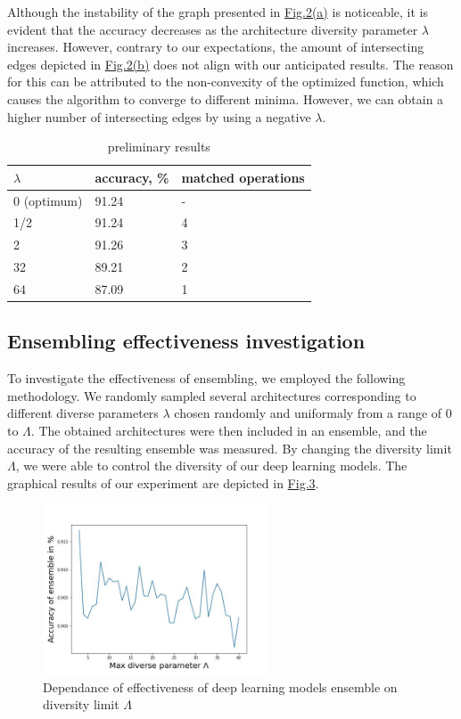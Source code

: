 \documentclass{article}
\begin{document}
Although the instability of the graph presented in \hyperref[fig:graph1]{Fig.2(a)} is noticeable, it is evident that the accuracy decreases as the architecture diversity parameter $\lambda$ increases.
However, contrary to our expectations, the amount of intersecting edges depicted in \hyperref[fig:graph2]{Fig.2(b)} does not align with our anticipated results.
The reason for this can be attributed to the non-convexity of the optimized function, which causes the algorithm to converge to different minima.
However, we can obtain a higher number of intersecting edges by using a negative $\lambda$.

\begin{table}[h   ]
	\caption{preliminary results}
	\centering
	\begin{tabular}{lll}
		\midrule
		$\lambda$     & accuracy, \% & matched operations \\
		\midrule
        0 (optimum) & 91.24 & - \\ 
        1/2  & 91.24 &  4   \\
		2  & 91.26   &  3   \\
		32 & 89.21   &  2   \\
		64 & 87.09   &  1   \\
		\bottomrule
	\end{tabular}
	\label{tab:prelim}
\end{table}

\subsection{Ensembling effectiveness investigation}

To investigate the effectiveness of ensembling, we employed the following methodology.
We randomly sampled several architectures corresponding to different diverse parameters $\lambda$ chosen randomly and uniformaly from a range of 0 to $\Lambda$.
The obtained architectures were then included in an ensemble, and the accuracy of the resulting ensemble was measured.
By changing the diversity limit $\Lambda$, we were able to control the diversity of our deep learning models.
The graphical results of our experiment are depicted in \hyperref[fig:graph3]{Fig.3}.

\begin{figure}[h]
    \centering
    \includegraphics[width=0.6\textwidth]{fig4}
    \caption{\label{fig:graph3} Dependance of effectiveness of deep learning models ensemble on diversity limit $\Lambda$}
\end{figure}
\end{document}
